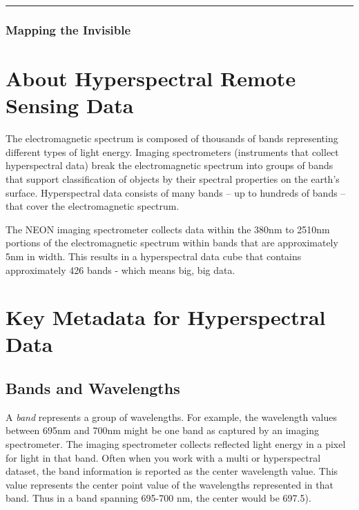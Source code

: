 \documentclass[]{book}
\begin{document}
\begin{center}\rule{0.5\linewidth}{0.5pt}\end{center}

\hypertarget{mapping-the-invisible}{%
\subsubsection{Mapping the Invisible}\label{mapping-the-invisible}}

\hypertarget{about-hyperspectral-remote-sensing-data}{%
\section{About Hyperspectral Remote Sensing Data}\label{about-hyperspectral-remote-sensing-data}}

The electromagnetic spectrum is composed of thousands of bands representing
different types of light energy. Imaging spectrometers (instruments that collect
hyperspectral data) break the electromagnetic spectrum into groups of bands
that support classification of objects by their spectral properties on the
earth's surface. Hyperspectral data consists of many bands -- up to hundreds of
bands -- that cover the electromagnetic spectrum.

The NEON imaging spectrometer collects data within the 380nm to 2510nm portions
of the electromagnetic spectrum within bands that are approximately 5nm in
width. This results in a hyperspectral data cube that contains approximately
426 bands - which means big, big data.

\hypertarget{key-metadata-for-hyperspectral-data}{%
\section{Key Metadata for Hyperspectral Data}\label{key-metadata-for-hyperspectral-data}}

\hypertarget{bands-and-wavelengths}{%
\subsection{Bands and Wavelengths}\label{bands-and-wavelengths}}

A \emph{band} represents a group of wavelengths. For example, the wavelength values
between 695nm and 700nm might be one band as captured by an imaging spectrometer.
The imaging spectrometer collects reflected light energy in a pixel for light
in that band. Often when you work with a multi or hyperspectral dataset, the
band information is reported as the center wavelength value. This value
represents the center point value of the wavelengths represented in that band.
Thus in a band spanning 695-700 nm, the center would be 697.5).
\end{document}
